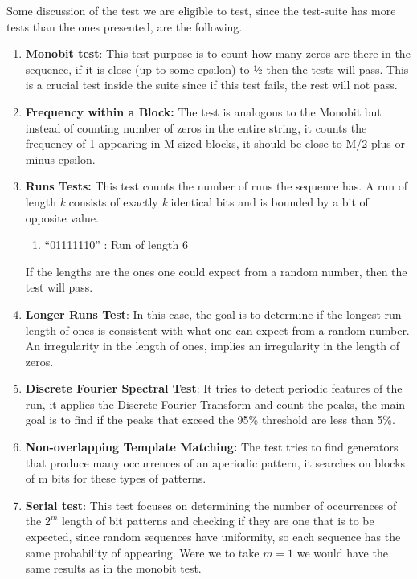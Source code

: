 Some discussion of the test we are eligible to test, since the test-suite has more tests than the ones presented, are the following.


\begin{enumerate}
\item  \textbf{Monobit test}: This test purpose is to count how many zeros are there in the sequence, if it is close (up to some epsilon) to ½ then the tests will pass. This is a crucial test inside the suite since if this test fails, the rest will not pass.

\item  \textbf{Frequency within a Block: }The test is analogous to the Monobit but instead of counting number of zeros in the entire string, it counts the frequency of 1 appearing in M-sized blocks, it should be close to M/2 plus or minus epsilon. 

\item  \textbf{Runs Tests: }This test counts the number of runs the sequence has. A run of length \textit{k} consists of exactly \textit{k} identical bits and is bounded by a bit of opposite value. 

\begin{enumerate}
\item  ``01111110'' : Run of length 6
\end{enumerate}


If the lengths are the ones one could expect from a random number, then the test will pass.


\item  \textbf{Longer Runs Test}: In this case, the goal is to determine if the longest run length of ones is consistent with what one can expect from a random number.  An irregularity in the length of ones, implies an irregularity in the length of zeros.

\item  \textbf{Discrete Fourier Spectral Test}: It tries to detect periodic features of the run, it applies the Discrete Fourier Transform and count the peaks, the main goal is to find if the peaks that exceed the 95\% threshold are less than 5\%.

\item  \textbf{Non-overlapping Template Matching:} The test tries to find generators that produce many occurrences of an aperiodic pattern, it searches on blocks of m bits for these types of patterns.

\item \textbf{ Serial test}: This test focuses on determining the number of occurrences of the $2^m$ length of bit patterns and checking if they are one that is to be expected, since random sequences have uniformity, so each sequence has the same probability of appearing. Were we to take $m=1$ we would have the same results as in the monobit test.


\end{enumerate}
